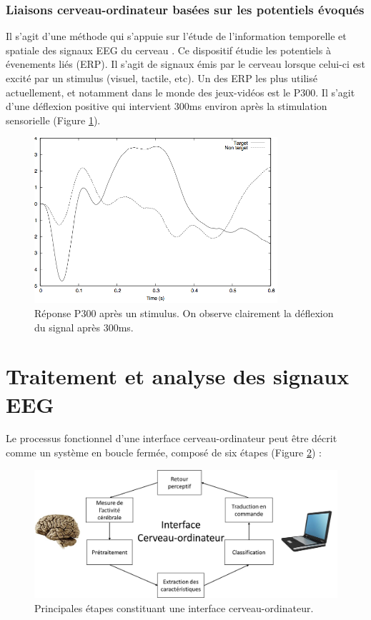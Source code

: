 \subsubsection{Liaisons cerveau-ordinateur basées sur les potentiels évoqués}
\label{Subsection : 4.Liaisons cerveau-ordinateur basées sur les potentiels évoqués}

Il s'agit d'une méthode qui s'appuie sur l'étude  de l'information temporelle et spatiale des signaux EEG du cerveau \cite{p300}. Ce dispositif étudie les potentiels à évenements liés (ERP). Il s'agit de signaux émis par le cerveau lorsque celui-ci est excité par un stimulus (visuel, tactile, etc). Un des ERP les plus utilisé actuellement, et notamment dans le monde des jeux-vidéos est le P300. Il s'agit d'une déflexion positive qui intervient 300ms environ après la stimulation sensorielle (Figure \ref{P300}).

\begin{figure}[h]
	\centering\includegraphics[width=9cm]{images/P300.png}
	\caption[Réponse P300]{Réponse P300 après un stimulus. On observe clairement la déflexion du signal après 300ms.}
	\label{P300}
\end{figure}

\section{Traitement et analyse des signaux EEG}
\label{Section : 4.Traitement et analyse des signaux EEG}

Le processus fonctionnel d'une interface cerveau-ordinateur peut être décrit comme un système en boucle fermée, composé de six étapes \cite{Saeid}\cite{Lotte} (Figure \ref{bci}) :

\begin{figure}[h]
	\centering\includegraphics[width=15cm]{images/bci.jpg}
	\caption{Principales étapes constituant une interface cerveau-ordinateur.}
	\label{bci}
\end{figure}

